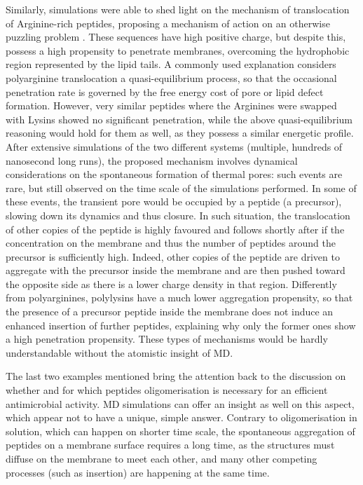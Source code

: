 Similarly, simulations were able to shed light on the mechanism of translocation of Arginine-rich peptides, proposing a mechanism of action on an otherwise puzzling problem \cite{Sun2015}. These sequences have high positive charge, but despite this, possess a high propensity to penetrate membranes, overcoming the hydrophobic region represented by the lipid tails.
%
A commonly used explanation considers polyarginine translocation a quasi-equilibrium process, so that the occasional penetration rate is governed by the free energy cost of pore or lipid defect formation.
%
However, very similar peptides where the Arginines were swapped with Lysins showed no significant penetration, while the above quasi-equilibrium reasoning would hold for them as well, as they possess a similar energetic profile.
%
After extensive simulations of the two different systems (multiple, hundreds of nanosecond long runs), the proposed mechanism involves dynamical considerations on the spontaneous formation of thermal pores: such events are rare, but still observed on the time scale of the simulations performed.
%
In some of these events, the transient pore would be occupied by a peptide (a precursor), slowing down its dynamics and thus closure. In such situation, the translocation of other copies of the peptide is highly favoured and follows shortly after if the concentration on the membrane and thus the number of peptides around the precursor is sufficiently high. Indeed, other copies of the peptide are driven to aggregate with the precursor inside the membrane and are then pushed toward the opposite side as there is a lower charge density in that region.
%
Differently from polyarginines, polylysins have a much lower aggregation propensity, so that the presence of a precursor peptide inside the membrane does not induce an enhanced insertion of further peptides, explaining why only the former ones show a high penetration propensity. These types of mechanisms would be hardly understandable without the atomistic insight of MD.

The last two examples mentioned bring the attention back to the discussion on whether and for which peptides oligomerisation is necessary for an efficient antimicrobial activity. MD simulations can offer an insight as well on this aspect, which appear not to have a unique, simple answer. Contrary to oligomerisation in solution, which can happen on shorter time scale, the spontaneous aggregation of peptides on a membrane surface requires a long time, as the structures must diffuse on the membrane to meet each other, and many other competing processes (such as insertion) are happening at the same time.

